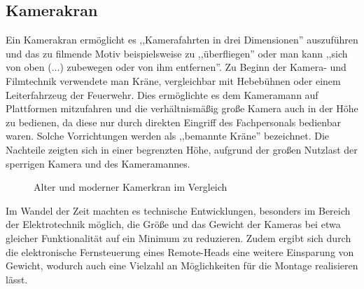 \documentclass[a4paper, 12pt, bibtotocnumbered, liststotocnumbered]{scrartcl}
\begin{document}
	\subsection{Kamerakran}
	Ein Kamerakran ermöglicht es ,,Kamerafahrten in drei Dimensionen”\cite{wikipedia-kamerakran} auszuführen und das zu filmende Motiv beispielsweise zu ,,überfliegen”\cite{wikipedia-kamerakran} oder man kann ,,sich von oben (...) zubewegen oder von ihm entfernen”\cite{wikipedia-kamerakran}. Zu Beginn der Kamera- und Filmtechnik verwendete man Kräne, vergleichbar mit Hebebühnen oder einem Leiterfahrzeug der Feuerwehr. Dies ermöglichte es dem Kameramann auf Plattformen mitzufahren und die verhältnismäßig große Kamera auch in der Höhe zu bedienen, da diese nur durch direkten Eingriff des Fachpersonals bedienbar waren. Solche Vorrichtungen werden als ,,bemannte Kräne”\cite{wikipedia-kamerakran} bezeichnet. Die Nachteile zeigten sich in einer begrenzten Höhe, aufgrund der großen Nutzlast der sperrigen Kamera und des Kameramannes.

	\begin{figure}[htb]
		\centering
		\hfill
		\caption{Alter und moderner Kamerkran im Vergleich}
	\end{figure}

	Im Wandel der Zeit machten es technische Entwicklungen, besonders im Bereich der Elektrotechnik möglich, die Größe und das Gewicht der Kameras bei etwa gleicher Funktionalität auf ein Minimum zu reduzieren. Zudem ergibt sich durch die elektronische Fernsteuerung eines Remote-Heads eine weitere Einsparung von Gewicht, wodurch auch eine Vielzahl an Möglichkeiten für die Montage realisieren lässt.
\end{document}
